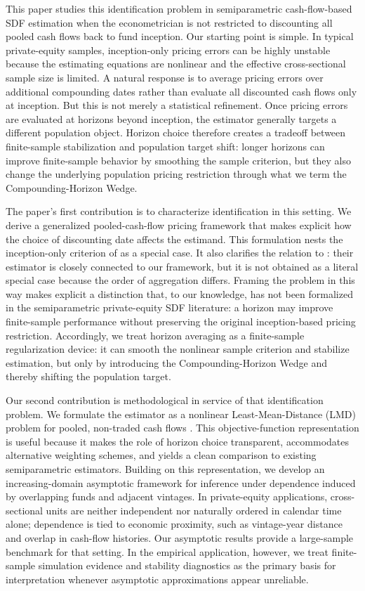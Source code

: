 This paper studies this identification problem in semiparametric cash-flow-based SDF estimation when the econometrician is not restricted to discounting all pooled cash flows back to fund inception. 
Our starting point is simple. 
In typical private-equity samples, inception-only pricing errors can be highly unstable because the estimating equations are nonlinear and the effective cross-sectional sample size is limited. 
A natural response is to average pricing errors over additional compounding dates rather than evaluate all discounted cash flows only at inception. 
But this is not merely a statistical refinement. Once pricing errors are evaluated at horizons beyond inception, the estimator generally targets a different population object. 
Horizon choice therefore creates a tradeoff between finite-sample stabilization and population target shift: longer horizons can improve finite-sample behavior by smoothing the sample criterion, but they also change the underlying population pricing restriction through what we term the Compounding-Horizon Wedge.

The paper's first contribution is to characterize identification in this setting. 
We derive a generalized pooled-cash-flow pricing framework that makes explicit how the choice of discounting date affects the estimand. 
This formulation nests the inception-only criterion of \citet{DLP12} as a special case. 
It also clarifies the relation to \citet{KN16}: their estimator is closely connected to our framework, but it is not obtained as a literal special case because the order of aggregation differs. 
Framing the problem in this way makes explicit a distinction that, to our knowledge, has not been formalized in the semiparametric private-equity SDF literature: a horizon may improve finite-sample performance without preserving the original inception-based pricing restriction.
Accordingly, we treat horizon averaging as a finite-sample regularization device: it can smooth the nonlinear sample criterion and stabilize estimation, but only by introducing the Compounding-Horizon Wedge and thereby shifting the population target.

Our second contribution is methodological in service of that identification problem. 
We formulate the estimator as a nonlinear Least-Mean-Distance (LMD) problem for pooled, non-traded cash flows \citep{PP97}. 
This objective-function representation is useful because it makes the role of horizon choice transparent, accommodates alternative weighting schemes, and yields a clean comparison to existing semiparametric estimators. 
Building on this representation, we develop an increasing-domain asymptotic framework for inference under dependence induced by overlapping funds and adjacent vintages. 
In private-equity applications, cross-sectional units are neither independent nor naturally ordered in calendar time alone; dependence is tied to economic proximity, such as vintage-year distance and overlap in cash-flow histories. 
Our asymptotic results provide a large-sample benchmark for that setting. 
In the empirical application, however, we treat finite-sample simulation evidence and stability diagnostics as the primary basis for interpretation whenever asymptotic approximations appear unreliable.

